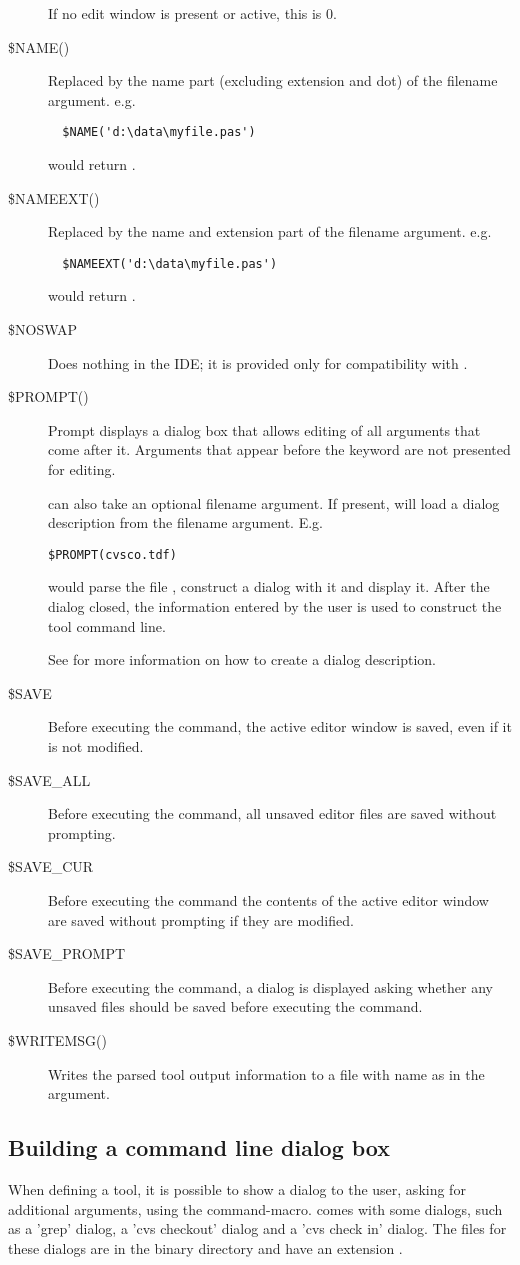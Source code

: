 \begin{description}
If no edit window is present or active, this is 0.
\item[\$NAME()]
Replaced by the name part (excluding extension and dot) of the filename
argument.
e.g.
\begin{verbatim}
  $NAME('d:\data\myfile.pas')
\end{verbatim}
would return .
\item[\$NAMEEXT()]
Replaced by the name and extension part of the filename argument.
e.g.
\begin{verbatim}
  $NAMEEXT('d:\data\myfile.pas')
\end{verbatim}
would return .
\item[\$NOSWAP]
Does nothing in the IDE; it is provided only for compatibility with \tp.
\item[\$PROMPT()]
Prompt displays a dialog box that allows editing of all arguments that
come after it. Arguments that appear before the  keyword
are not presented for editing.

 can also take an optional filename argument. If present,  will load
a dialog description from the filename argument. E.g.
\begin{verbatim}
$PROMPT(cvsco.tdf)
\end{verbatim}
would parse the file , construct a dialog with it and
display it. After the dialog closed, the information entered by the user
is used to construct the tool command line.

See  for more information on how to create a dialog
description.
\item[\$SAVE]
Before executing the command, the active editor window is saved, even if it is not modified.
\item[\$SAVE\_ALL]
Before executing the command, all unsaved editor files are saved without prompting.
\item[\$SAVE\_CUR]
Before executing the command the contents of the active editor window are
saved without prompting if they are modified.
\item[\$SAVE\_PROMPT]
Before executing the command, a dialog is displayed asking whether any
unsaved files should be saved before executing the command.
\item[\$WRITEMSG()]
Writes the parsed tool output information to a file with name as in the argument.
\end{description}	

\subsection{Building a command line dialog box}
\label{se:commanddialogs}
When defining a tool, it is possible to show a dialog to the user, asking for
additional arguments, using the  command-macro.
\fpc comes with some dialogs, such as a 'grep' dialog, a 'cvs checkout' dialog
and a 'cvs check in' dialog. The files for these dialogs are in the binary
directory and have an extension .

